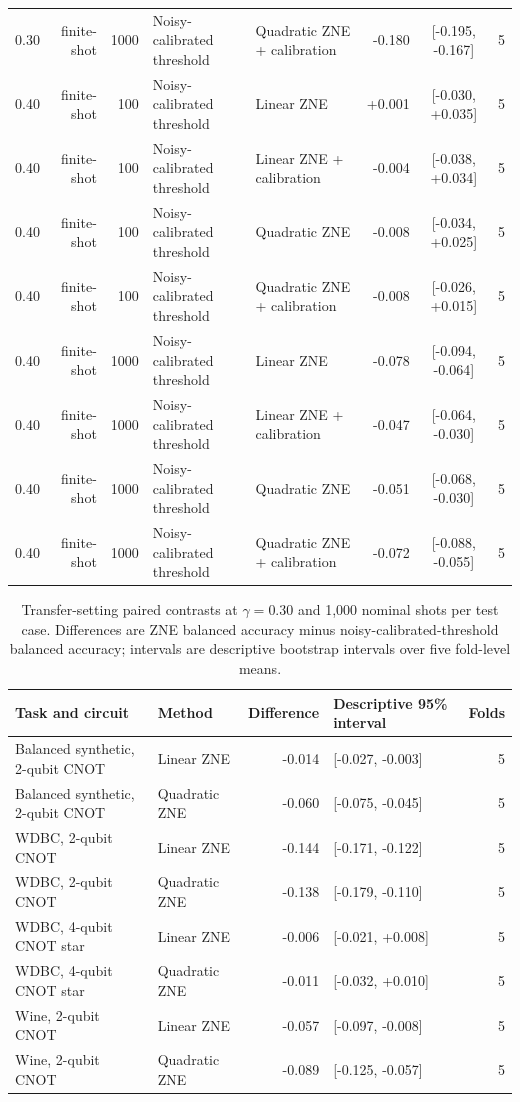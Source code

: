 \documentclass[10pt]{article}
\begin{document}
\begin{table}[H]
\begin{tabular}{@{}l r r l l r c r@{}}
0.30 & finite-shot & 1000 & Noisy-calibrated threshold & Quadratic ZNE + calibration & -0.180 & [-0.195, -0.167] & 5 \\
0.40 & finite-shot & 100 & Noisy-calibrated threshold & Linear ZNE & +0.001 & [-0.030, +0.035] & 5 \\
0.40 & finite-shot & 100 & Noisy-calibrated threshold & Linear ZNE + calibration & -0.004 & [-0.038, +0.034] & 5 \\
0.40 & finite-shot & 100 & Noisy-calibrated threshold & Quadratic ZNE & -0.008 & [-0.034, +0.025] & 5 \\
0.40 & finite-shot & 100 & Noisy-calibrated threshold & Quadratic ZNE + calibration & -0.008 & [-0.026, +0.015] & 5 \\
0.40 & finite-shot & 1000 & Noisy-calibrated threshold & Linear ZNE & -0.078 & [-0.094, -0.064] & 5 \\
0.40 & finite-shot & 1000 & Noisy-calibrated threshold & Linear ZNE + calibration & -0.047 & [-0.064, -0.030] & 5 \\
0.40 & finite-shot & 1000 & Noisy-calibrated threshold & Quadratic ZNE & -0.051 & [-0.068, -0.030] & 5 \\
0.40 & finite-shot & 1000 & Noisy-calibrated threshold & Quadratic ZNE + calibration & -0.072 & [-0.088, -0.055] & 5 \\
\bottomrule
\end{tabular}
\end{table}

\begin{table}[H]\centering\scriptsize
\caption{Transfer-setting paired contrasts at $\gamma=0.30$ and 1,000 nominal shots per test case. Differences are ZNE balanced accuracy minus noisy-calibrated-threshold balanced accuracy; intervals are descriptive bootstrap intervals over five fold-level means.}
\label{tab:transferpaired}
\begin{tabular}{@{}l l r l r@{}}\toprule
Task and circuit & Method & Difference & Descriptive 95\% interval & Folds \\
\midrule
Balanced synthetic, 2-qubit CNOT & Linear ZNE & -0.014 & [-0.027, -0.003] & 5 \\
Balanced synthetic, 2-qubit CNOT & Quadratic ZNE & -0.060 & [-0.075, -0.045] & 5 \\
WDBC, 2-qubit CNOT & Linear ZNE & -0.144 & [-0.171, -0.122] & 5 \\
WDBC, 2-qubit CNOT & Quadratic ZNE & -0.138 & [-0.179, -0.110] & 5 \\
WDBC, 4-qubit CNOT star & Linear ZNE & -0.006 & [-0.021, +0.008] & 5 \\
WDBC, 4-qubit CNOT star & Quadratic ZNE & -0.011 & [-0.032, +0.010] & 5 \\
Wine, 2-qubit CNOT & Linear ZNE & -0.057 & [-0.097, -0.008] & 5 \\
Wine, 2-qubit CNOT & Quadratic ZNE & -0.089 & [-0.125, -0.057] & 5 \\
\bottomrule\end{tabular}\end{table}
\end{document}
